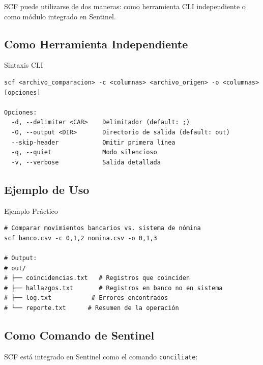 SCF puede utilizarse de dos maneras: como herramienta CLI independiente o como módulo integrado en Sentinel.

\subsection{Como Herramienta Independiente}

\begin{caja}{Sintaxis CLI}
\begin{verbatim}
scf <archivo_comparacion> -c <columnas> <archivo_origen> -o <columnas> [opciones]

Opciones:
  -d, --delimiter <CAR>    Delimitador (default: ;)
  -O, --output <DIR>       Directorio de salida (default: out)
  --skip-header            Omitir primera línea
  -q, --quiet              Modo silencioso
  -v, --verbose            Salida detallada
\end{verbatim}
\end{caja}


\bigskip

\subsection{Ejemplo de Uso}

\begin{caja}{Ejemplo Práctico}
\begin{verbatim}
# Comparar movimientos bancarios vs. sistema de nómina
scf banco.csv -c 0,1,2 nomina.csv -o 0,1,3

# Output:
# out/
# ├── coincidencias.txt   # Registros que coinciden
# ├── hallazgos.txt       # Registros en banco no en sistema
# ├── log.txt           # Errores encontrados
# └── reporte.txt      # Resumen de la operación
\end{verbatim}
\end{caja}


\subsection{Como Comando de Sentinel}

SCF está integrado en Sentinel como el comando \texttt{conciliate}:

